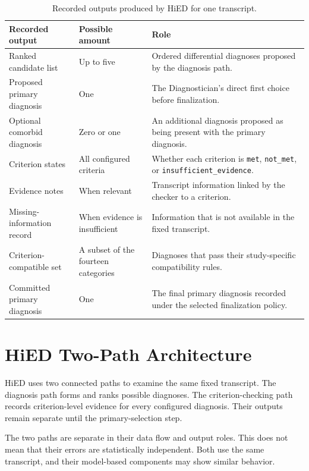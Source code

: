 \begin{table}[htbp]
\centering
\caption{Recorded outputs produced by HiED for one transcript.}
\label{tab:hied-output-space}
\label{tab:diagnostic-output-roles}
\footnotesize
\begin{tabularx}{\textwidth}{|>{\raggedright\arraybackslash}p{3.4cm}|>{\centering\arraybackslash}p{2.3cm}|>{\raggedright\arraybackslash}X|}
\hline
\textbf{Recorded output} & \textbf{Possible amount} & \textbf{Role}\\
\hline
Ranked candidate list & Up to five & Ordered differential diagnoses proposed by the diagnosis path.\\
\hline
Proposed primary diagnosis & One & The Diagnostician's direct first choice before finalization.\\
\hline
Optional comorbid diagnosis & Zero or one & An additional diagnosis proposed as being present with the primary diagnosis.\\
\hline
Criterion states & All configured criteria & Whether each criterion is \texttt{met}, \texttt{not\_met}, or \texttt{insufficient\_\allowbreak{}evidence}.\\
\hline
Evidence notes & When relevant & Transcript information linked by the checker to a criterion.\\
\hline
Missing-information record & When evidence is insufficient & Information that is not available in the fixed transcript.\\
\hline
Criterion-compatible set & A subset of the fourteen categories & Diagnoses that pass their study-specific compatibility rules.\\
\hline
Committed primary diagnosis & One & The final primary diagnosis recorded under the selected finalization policy.\\
\hline
\end{tabularx}
\end{table}

\section{HiED Two-Path Architecture}
\label{sec:hied-two-path-architecture}

HiED uses two connected paths to examine the same fixed transcript. The diagnosis path forms and ranks possible diagnoses. The criterion-checking path records criterion-level evidence for every configured diagnosis. Their outputs remain separate until the primary-selection step.

The two paths are separate in their data flow and output roles. This does not mean that their errors are statistically independent. Both use the same transcript, and their model-based components may show similar behavior.

